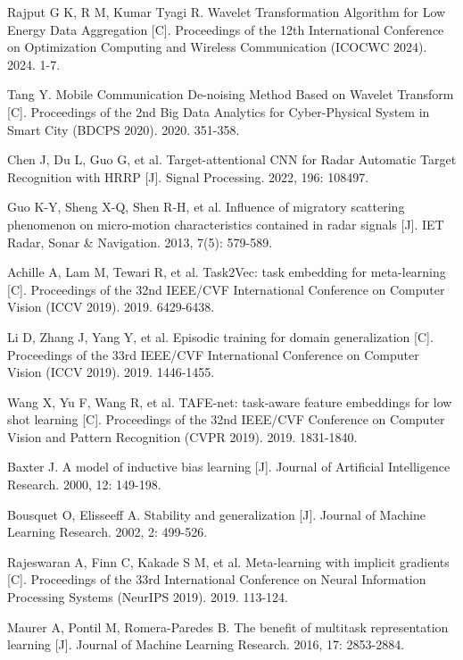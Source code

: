 \documentclass[doctor,twoside,ttf]{nudtpaper}
\begin{document}
\begin{thebibliography}{99}
 Rajput G K, R M, Kumar Tyagi R. Wavelet Transformation Algorithm for Low Energy Data Aggregation [C]. Proceedings of the 12th International Conference on Optimization Computing and Wireless Communication (ICOCWC 2024). 2024. 1-7.

 Tang Y. Mobile Communication De-noising Method Based on Wavelet Transform [C]. Proceedings of the 2nd Big Data Analytics for Cyber-Physical System in Smart City (BDCPS 2020). 2020. 351-358.

 Chen J, Du L, Guo G, et al. Target-attentional CNN for Radar Automatic Target Recognition with HRRP [J]. Signal Processing. 2022, 196: 108497.

 Guo K-Y, Sheng X-Q, Shen R-H, et al. Influence of migratory scattering phenomenon on micro-motion characteristics contained in radar signals [J]. IET Radar, Sonar \& Navigation. 2013, 7(5): 579-589.

 Achille A, Lam M, Tewari R, et al. Task2Vec: task embedding for meta-learning [C]. Proceedings of the 32nd IEEE/CVF International Conference on Computer Vision (ICCV 2019). 2019. 6429-6438.

 Li D, Zhang J, Yang Y, et al. Episodic training for domain generalization [C]. Proceedings of the 33rd IEEE/CVF International Conference on Computer Vision (ICCV 2019). 2019. 1446-1455.

 Wang X, Yu F, Wang R, et al. TAFE-net: task-aware feature embeddings for low shot learning [C]. Proceedings of the 32nd IEEE/CVF Conference on Computer Vision and Pattern Recognition (CVPR 2019). 2019. 1831-1840.

 Baxter J. A model of inductive bias learning [J]. Journal of Artificial Intelligence Research. 2000, 12: 149-198.

 Bousquet O, Elisseeff A. Stability and generalization [J]. Journal of Machine Learning Research. 2002, 2: 499-526.

 Rajeswaran A, Finn C, Kakade S M, et al. Meta-learning with implicit gradients [C]. Proceedings of the 33rd International Conference on Neural Information Processing Systems (NeurIPS 2019). 2019. 113-124.

 Maurer A, Pontil M, Romera-Paredes B. The benefit of multitask representation learning [J]. Journal of Machine Learning Research. 2016, 17: 2853-2884.


\end{thebibliography}
\end{document}
